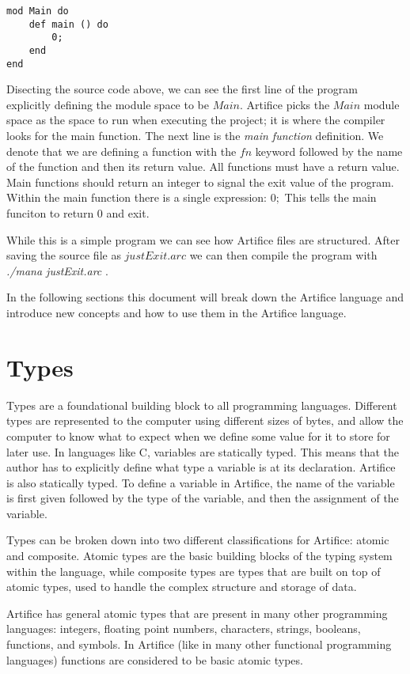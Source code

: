 \documentclass{article}
\begin{document}
\begin{lstlisting}
mod Main do
	def main () do
		0;
	end
end
\end{lstlisting}

Disecting the source code above, we can see the first line of the program explicitly defining the module space to be $Main$. Artifice
picks the $Main$ module space as the space to run when executing the project; it is where the compiler looks for the main function.
The next line is the \textit{main function} definition. We denote that we are defining a function with the $fn$ keyword followed by
the name of the function and then its return value. All functions must have a return value. Main functions should return an integer
to signal the exit value of the program. Within the main function there is a single expression: $0;$ This tells the main funciton
to return $0$ and exit.

While this is a simple program we can see how Artifice files are structured. After saving the source file as $justExit.arc$ we can
then compile the program with \textit{./mana justExit.arc} .

In the following sections this document will break down the Artifice language and introduce new concepts and how to use them in the
Artifice language.


\section{Types}

Types are a foundational building block to all programming languages. Different types are represented to the computer using
different sizes of bytes, and allow the computer to know what to expect when we define some value for it to store for later
use. In languages like C, variables are statically typed. This means that the author has to explicitly define what type a
variable is at its declaration. Artifice is also statically typed. To define a variable in Artifice, the name of the variable is
first given followed by the type of the variable, and then the assignment of the variable.

Types can be broken down into two different classifications for Artifice: atomic and composite. Atomic types are the basic
building blocks of the typing system within the language, while composite types are types that are built on top of atomic
types, used to handle the complex structure and storage of data.

Artifice has general atomic types that are present in many other programming languages: integers, floating point numbers, characters,
strings, booleans, functions, and symbols. In Artifice (like in many other functional programming languages) functions are considered
to be basic atomic types.
\end{document}
